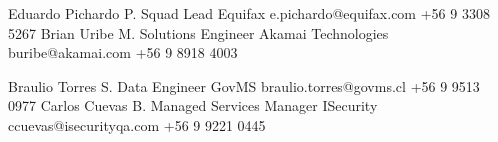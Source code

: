 %
%
%


\begin{referees}
	{Eduardo Pichardo P.}
	{Squad Lead}
	{Equifax}
	{e.pichardo@equifax.com}
	{+56 9 3308 5267}
	{Brian Uribe M.}
	{Solutions Engineer}
	{Akamai Technologies}
	{buribe@akamai.com}
	{+56 9 8918 4003}
\end{referees}

\begin{referees}
	{Braulio Torres S.}
	{Data Engineer}
	{GovMS}
	{braulio.torres@govms.cl}
	{+56 9 9513 0977}
	{Carlos Cuevas B.}
	{Managed Services Manager}
	{ISecurity}
	{ccuevas@isecurityqa.com}
	{+56 9 9221 0445}
\end{referees}


